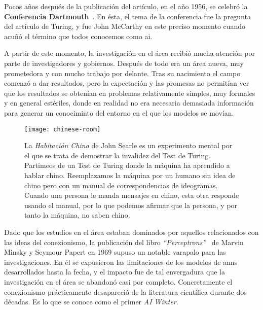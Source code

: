 Pocos años después de la publicación del artículo, en el año 1956, se celebró la \textbf{Conferencia Dartmouth}~\cite{mccarthy1956dartmouth}. En ésta, el tema de la conferencia fue la pregunta del artículo de Turing, y fue John McCarthy en este preciso momento cuando acuñó el término que todos conocemos como \ac{ai}.

A partir de este momento, la investigación en el área recibió mucha atención por parte de investigadores y gobiernos. Después de todo era un área nueva, muy prometedora y con mucho trabajo por delante. Tras su nacimiento el campo comenzó a dar resultados, pero la expectación y las promesas no permitían ver que los resultados se obtenían en problemas relativamente simples, muy formales y en general estériles, donde en realidad no era necesaria demasiada información para generar un conociminto del entorno en el que los modelos se movían.

\begin{figure}[t]
	\centering
	\texttt{[image: chinese-room]}
	\label{fig:chinese-room}
	\caption[Experimento mental de la \textit{Habitación China}, por John Searle.]{La \textit{Habitación China} de John Searle es un experimento mental por el que se trata de demostrar la invalidez del Test de Turing. Partimeos de un Test de Turing donde la máquina ha aprendido a hablar chino. Reemplazamos la máquina por un humano sin idea de chino pero con un manual de correspondencias de ideogramas. Cuando una persona le manda mensajes en chino, esta otra responde usando el manual, por lo que podemos afirmar que la persona, y por tanto la máquina, no saben chino.}
\end{figure}

Dado que los estudios en el área estaban dominados por aquellos relacionados con las ideas del conexionismo, la publicación del libro \textit{\enquote{Perceptrons}}~\cite{minsky1969perceptrons} de Marvin Minsky y Seymour Papert en 1969 supuso un notable varapalo para las investigaciones. En él se expusieron las limitaciones de los modelos de \acp{ann} desarrollados hasta la fecha, y el impacto fue de tal envergadura que la investigación en el área se abandonó casi por completo. Concretamente el conexionismo prácticamente desapareció de la literatura científica durante dos décadas. Es lo que se conoce como el primer \textit{AI Winter}.

